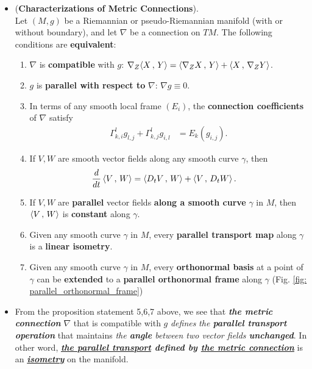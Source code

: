 \documentclass[11pt]{article}
\begin{document}
\begin{itemize}
\item \begin{proposition} (\textbf{Characterizations of Metric Connections}).\\
Let $(M, g)$ be a Riemannian or pseudo-Riemannian manifold (with or without boundary), and let $\nabla$ be a connection on $TM$. The following conditions are \textbf{equivalent}:
\begin{enumerate}
\item $\nabla$ is \textbf{compatible} with $g$: $\nabla_{Z}{\left\langle X\,,\, Y \right\rangle} = \left\langle \nabla_{Z}{X}\,,\, Y \right\rangle + \left\langle X\,,\, \nabla_{Z}{Y} \right\rangle$.
\item $g$ is \textbf{parallel with respect to} $\nabla$: $\nabla g \equiv 0$.
\item In terms of any smooth local frame $(E_i)$, the \textbf{connection coefficients} of $\nabla$ satisfy
\begin{align}
\Gamma_{k,i}^{l}g_{l,j} + \Gamma_{k,j}^{l}g_{i,l} &= E_k(g_{i,j}).  \label{eqn: metric_connection_christoffel_symbol}
\end{align}
\item If $V, W$ are smooth vector fields along any smooth curve $\gamma$, then
\begin{align}
\frac{d}{dt}\left\langle V\,,\, W \right\rangle &= \left\langle D_tV\,,\, W \right\rangle + \left\langle V\,,\, D_tW \right\rangle. \label{eqn: metric_connection_derivative_of_inn}
\end{align}
\item If $V, W$ are \textbf{parallel} vector fields \textbf{along a smooth curve} $\gamma$ in $M$, then $\left\langle V\,,\, W \right\rangle$ is \textbf{constant} along $\gamma$.
\item Given any smooth curve $\gamma$ in $M$, every \textbf{parallel transport map} along $\gamma$ is a \textbf{linear isometry}.
\item  Given any smooth curve $\gamma$ in $M$, every \textbf{orthonormal basis} at a point of $\gamma$ can be \textbf{extended} to a \textbf{parallel orthonormal frame} along $\gamma$ (Fig. \ref{fig: parallel_orthonormal_frame})
\end{enumerate}
\end{proposition}

\item \begin{remark}
From the proposition statement 5,6,7 above, we see that \emph{\textbf{the metric connection}} $\nabla$ that is compatible with $g$ \emph{defines} \emph{the \textbf{parallel transport operation}} that maintains \emph{the \textbf{angle} between two vector fields \textbf{unchanged}}. In other word, \emph{\textbf{\underline{the parallel transport} defined by \underline{the metric connection}}} is  an \emph{\textbf{\underline{isometry}}} on the manifold. 
\end{remark}


\end{itemize}
\end{document}
